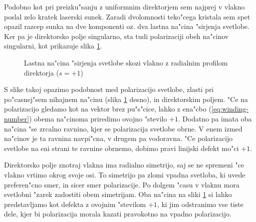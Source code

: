 \documentclass[a4paper,10pt]{article}
\begin{document}
Podobno kot pri preizku"sanju z uniformnim direktorjem sem najprej v vlakno poslal zelo kratek laserski sunek. 
Zaradi dvolomnosti teko"cega kristala sem spet opazil razcep sunka na dve komponenti oz. dva lastna na"cina "sirjenja svetlobe. 
Ker pa je direktorsko polje singularno, sta tudi polarizaciji obeh na"cinov singularni, kot prikazuje slika \ref{fig:pulse-p1-mode}. 

\begin{figure}[h]
 \centering
 \caption{Lastna na"cina "sirjenja svetlobe skozi vlakno z radialnim profilom direktorja ($s=+1$)}
 \label{fig:pulse-p1-mode}
\end{figure}

S slike takoj opazimo podobnost med polarizacijo svetlobe, zlasti pri po"casnej"sem nihajnem na"cinu (slika \ref{fig:pulse-p1-mode} desno), in direktorskim poljem. 
"Ce na polarizacijo gledamo kot na vektor brez pu"s"cice, lahko z ena"cbo (\ref{eq:winding-number}) obema na"cinoma priredimo ovojno "stevilo $+1$. 
Dodatno pa imata oba na"cina "se zrcalno ravnino, kjer se polarizacija svetlobe obrne. 
V enem izmed na"cinov je ta ravnina navpi"cna, v drugem pa vodoravna. 
"Ce polarizacijo svetlobe na eni strani te ravnine obrnemo, dobimo pravi linijski defekt mo"ci $+1$. 

Direktorsko polje znotraj vlakna ima radialno simetrijo, saj se ne spremeni "ce vlakno vrtimo okrog svoje osi. 
To simetrijo pa zlomi vpadna svetloba, ki uvede preferen"cno smer, in sicer smer polarizacije. 
Po dolgem "casu v vlaknu mora svetlobni "zarek zadostiti obem simetrijam. 
Oba na"cina na sliki \ref{fig:pulse-p1-mode} si lahko predstavljamo kot defekta z ovojnim "stevilom $+1$, ki jim odstranimo vse tiste dele, kjer bi polarizacija morala kazati pravokotno na vpadno polarizacijo. 
\end{document}
